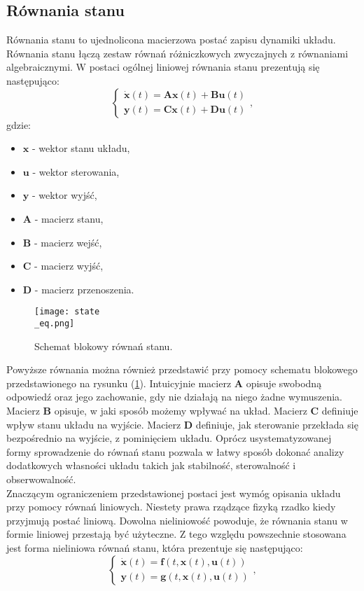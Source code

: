\subsection{Równania stanu}

Równania stanu to ujednolicona macierzowa postać zapisu dynamiki układu. Równania stanu łączą zestaw równań różniczkowych zwyczajnych z równaniami algebraicznymi. W postaci ogólnej liniowej równania stanu prezentują się następująco:
\[
	\begin{cases}
		\dot{\bm{x}} \left(t\right)  = \bm{Ax} \left(t\right)  + \bm{Bu} \left(t\right) \\
		\bm{y} \left(t\right) = \bm{Cx} \left(t\right) + \bm{Du} \left(t\right)
	\end{cases},
\]
gdzie:
\begin{itemize}[noitemsep,nolistsep]
\item $\bm{x}$ - wektor stanu układu,
\item $\bm{u}$ - wektor sterowania,
\item $\bm{y}$ - wektor wyjść,
\item $\bm{A}$ - macierz stanu,
\item $\bm{B}$ - macierz wejść,
\item $\bm{C}$ - macierz wyjść,
\item $\bm{D}$ - macierz przenoszenia.
\end{itemize}




\begin{figure}[!h]
   	\centering
      	\texttt{[image: state\\\_eq.png]}
      	\caption{Schemat blokowy równań stanu.}
      	\label{rnie_stanu}
\end{figure}

Powyższe równania można również przedstawić przy pomocy schematu blokowego przedstawionego na rysunku (\ref{rnie_stanu}).
Intuicyjnie macierz $\bm{A}$ opisuje swobodną odpowiedź oraz jego zachowanie, gdy nie działają na niego żadne wymuszenia. Macierz $\bm{B}$ opisuje, w jaki sposób możemy wpływać na układ. Macierz $\bm{C}$ definiuje wpływ stanu układu na wyjście. Macierz $\bm{D}$ definiuje, jak sterowanie przekłada się bezpośrednio na wyjście, z pominięciem układu. Oprócz usystematyzowanej formy sprowadzenie do równań stanu pozwala w łatwy sposób dokonać analizy dodatkowych własności układu takich jak stabilność, sterowalność i obserwowalność.\\

Znaczącym ograniczeniem przedstawionej postaci jest wymóg opisania układu przy pomocy równań liniowych. Niestety prawa rządzące fizyką rzadko kiedy przyjmują postać liniową. Dowolna nieliniowość powoduje, że równania stanu w formie liniowej przestają być użyteczne. Z tego względu powszechnie stosowana jest forma nieliniowa równań stanu, która prezentuje się następująco:
\[
	\begin{cases}
		\dot{\bm{x}} \left(t\right)  =  \bm{f}  \left( t, \bm{x} \left(t\right)  , \bm{u} \left(t\right) \right) \\
		\bm{y} \left(t\right) = \bm{g}  \left( t, \bm{x} \left(t\right) , \bm{u} \left(t\right) \right)
	\end{cases},
\]

